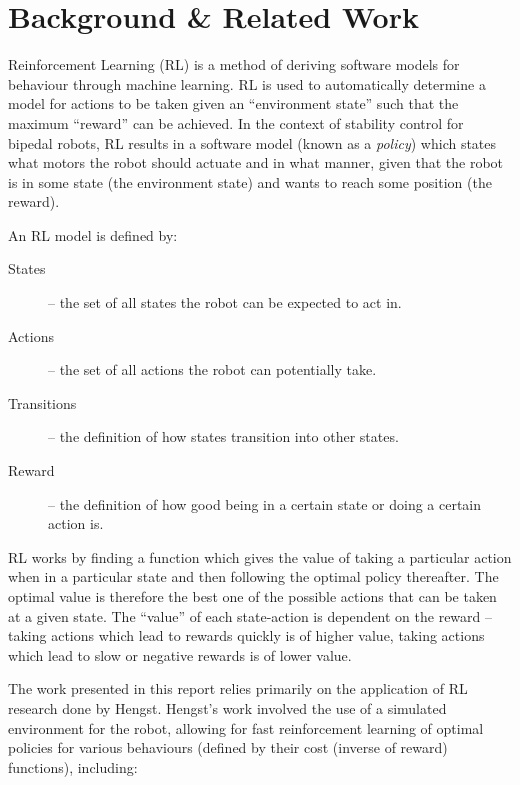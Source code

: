 \newpage
\section{Background \& Related Work}

Reinforcement Learning (RL) is a method of deriving software models for behaviour through machine learning. RL is used to automatically determine a model for actions to be taken given an ``environment state'' such that the maximum ``reward'' can be achieved. In the context of stability control for bipedal robots, RL results in a software model (known as a \textit{policy}) which states what motors the robot should actuate and in what manner, given that the robot is in some state (the environment state) and wants to reach some position (the reward).

An RL model is defined by:\cite{bernhard_rl}

\begin{description}
\item[States] -- the set of all states the robot can be expected to act in.
\item[Actions] -- the set of all actions the robot can potentially take.
\item[Transitions] -- the definition of how states transition into other states.
\item[Reward] -- the definition of how good being in a certain state or doing a certain action is.
\end{description}


RL works by finding a function which gives the value of taking a particular action when in a particular state and then following the optimal policy thereafter. The optimal value is therefore the best one of the possible actions that can be taken at a given state. The ``value'' of each state-action is dependent on the reward -- taking actions which lead to rewards quickly is of higher value, taking actions which lead to slow or negative rewards is of lower value.

The work presented in this report relies primarily on the application of RL research done by Hengst\cite{bernhard_rl}. Hengst's work involved the use of a simulated environment for the robot, allowing for fast reinforcement learning of optimal policies for various behaviours (defined by their cost (inverse of reward) functions), including:

